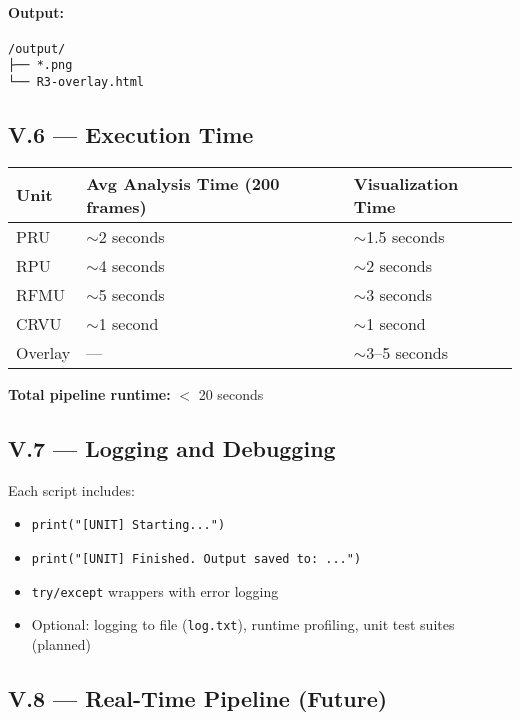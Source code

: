 \documentclass{article}
\begin{document}
\paragraph{Output:}
\begin{verbatim}
/output/
├── *.png
└── R3-overlay.html
\end{verbatim}

\subsection*{V.6 — Execution Time}

\begin{center}
\begin{tabular}{|l|l|l|}
\hline
\textbf{Unit} & \textbf{Avg Analysis Time (200 frames)} & \textbf{Visualization Time} \\
\hline
PRU & $\sim$2 seconds & $\sim$1.5 seconds \\
RPU & $\sim$4 seconds & $\sim$2 seconds \\
RFMU & $\sim$5 seconds & $\sim$3 seconds \\
CRVU & $\sim$1 second & $\sim$1 second \\
Overlay & — & $\sim$3–5 seconds \\
\hline
\end{tabular}
\end{center}

\textbf{Total pipeline runtime:} $<$ 20 seconds

\subsection*{V.7 — Logging and Debugging}

Each script includes:

\begin{itemize}
    \item \texttt{print("[UNIT] Starting...")}
    \item \texttt{print("[UNIT] Finished. Output saved to: ...")}
    \item \texttt{try/except} wrappers with error logging
    \item Optional: logging to file (\texttt{log.txt}), runtime profiling, unit test suites (planned)
\end{itemize}

\subsection*{V.8 — Real-Time Pipeline (Future)}
\end{document}
